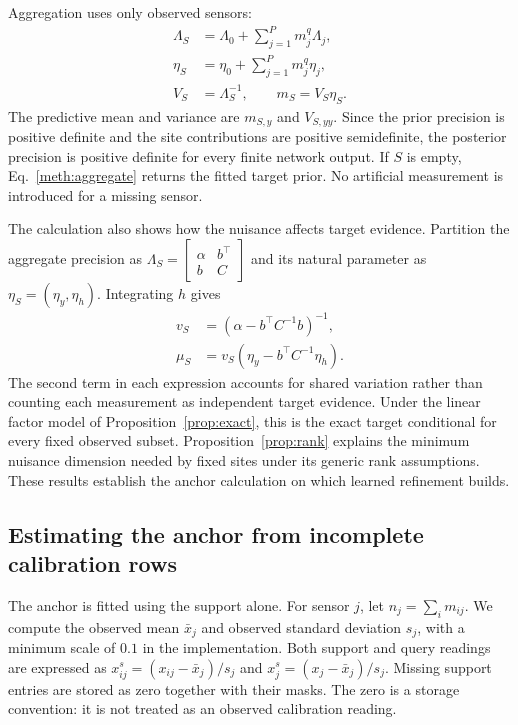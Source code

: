 Aggregation uses only observed sensors:
\begin{align}
  \Lambda_S&=\Lambda_0+\sum_{j=1}^{P}m^q_j\Lambda_j,\nonumber\\
  \eta_S&=\eta_0+\sum_{j=1}^{P}m^q_j\eta_j,\nonumber\\
  V_S&=\Lambda_S^{-1},\qquad m_S=V_S\eta_S.
  \label{meth:aggregate}
\end{align}
The predictive mean and variance are $m_{S,y}$ and $V_{S,yy}$. Since the prior precision is positive definite and the site contributions are positive semidefinite, the posterior precision is positive definite for every finite network output. If $S$ is empty, Eq.~\eqref{meth:aggregate} returns the fitted target prior. No artificial measurement is introduced for a missing sensor.

The calculation also shows how the nuisance affects target evidence. Partition the aggregate precision as $\Lambda_S=\left[\begin{smallmatrix}\alpha&b^\top\\b&C\end{smallmatrix}\right]$ and its natural parameter as $\eta_S=(\eta_y,\eta_h)$. Integrating $h$ gives
\begin{equation}
  \begin{aligned}
  v_S&=(\alpha-b^\top C^{-1}b)^{-1},\\
  \mu_S&=v_S(\eta_y-b^\top C^{-1}\eta_h).
  \end{aligned}
  \label{meth:schur}
\end{equation}
The second term in each expression accounts for shared variation rather than counting each measurement as independent target evidence. Under the linear factor model of Proposition~\ref{prop:exact}, this is the exact target conditional for every fixed observed subset. Proposition~\ref{prop:rank} explains the minimum nuisance dimension needed by fixed sites under its generic rank assumptions. These results establish the anchor calculation on which learned refinement builds.

\subsection{Estimating the anchor from incomplete calibration rows}

The anchor is fitted using the support alone. For sensor $j$, let $n_j=\sum_i m_{ij}$. We compute the observed mean $\bar x_j$ and observed standard deviation $s_j$, with a minimum scale of $0.1$ in the implementation. Both support and query readings are expressed as $x^{s}_{ij}=(x_{ij}-\bar x_j)/s_j$ and $x^{s}_j=(x_j-\bar x_j)/s_j$. Missing support entries are stored as zero together with their masks. The zero is a storage convention: it is not treated as an observed calibration reading.

